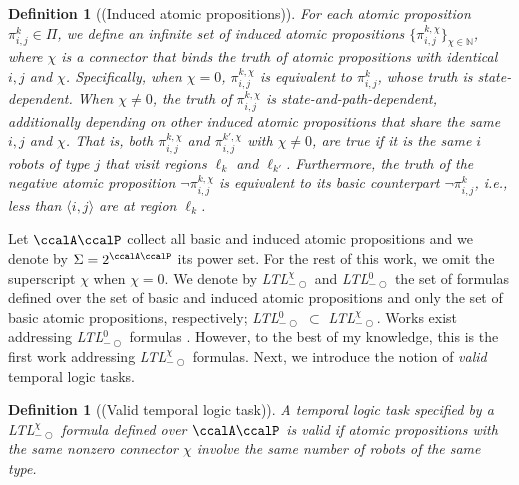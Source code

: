 \documentclass[Afour,sageh,times]{sagej}
\newtheorem{defn}[thm]{Definition}
\newcommand{\ltlx}{ {\it LTL}$_{-\bigcirc}^\chi$ }
\newcommand{\ltlz}{ {\it LTL}$_{-\bigcirc}^0$ }
\newcommand{\ag}[2]{\langle#1,#2\rangle}
\renewcommand{\ap}[3]{\mathcal{\pi}_{{#1},{#2}}^{#3}}
\begin{document}
\begin{defn}[(Induced atomic propositions)]
   For each atomic proposition $\ap{i}{j}{k} \in \Pi$, we define an infinite set of  {induced} atomic propositions $\{\ap{i}{j}{k,\chi}\}_{\chi\in \mathbb{N}}$, where $\chi$ is a connector that binds the truth of  atomic propositions with identical $i, j$ and $\chi$. Specifically, when $\chi=0$, $\ap{i}{j}{k,\chi}$ is equivalent to $\ap{i}{j}{k}$, whose truth is state-dependent. When $\chi \neq 0$, the truth of $\ap{i}{j}{k,\chi}$ is state-and-path-dependent, additionally depending on other induced atomic propositions that share the same $i,j$ and $\chi$. That is, both $\ap{i}{j}{k,\chi}$ and $\ap{i}{j}{k',\chi}$  with $\chi\not=0$, are true if it is the same $i$ robots of type $j$ that visit regions $\ell_k$ and $\ell_{k'}$. Furthermore, the truth of the negative atomic proposition  $\neg \ap{i}{j}{k,\chi}$ is equivalent to its basic counterpart $\neg \ap{i}{j}{k}$, i.e., less than $\ag{i}{j}$ are at region $\ell_k$.
\end{defn}
Let $\ccalA\ccalP$ collect all basic and induced atomic propositions and we denote by $\Sigma=2^{\ccalA\ccalP}$ its power set.  For the rest of this work, we omit the superscript $\chi$ when $\chi=0$. We denote by \ltlx and \ltlz the set of formulas defined over the set of basic and  induced atomic propositions and only the set of basic atomic propositions, respectively; \ltlz$\subset$ {\it LTL}$_{-\bigcirc}^\chi$.  Works exist addressing \ltlz formulas \citep{sahin2017provably,sahin2017synchronous,sahin2019multirobot}. However, to the best of my knowledge, this is the first work addressing \ltlx formulas. Next, we introduce the notion of {\it valid} temporal logic tasks.
 \begin{defn}[(Valid temporal logic task)]\label{defn:valid}
A temporal logic task specified by a\ltlx formula defined over $\ccalA\ccalP$ is valid if atomic propositions with the same nonzero connector $\chi$ involve the same number of robots of the same type.
 \end{defn}
\end{document}
